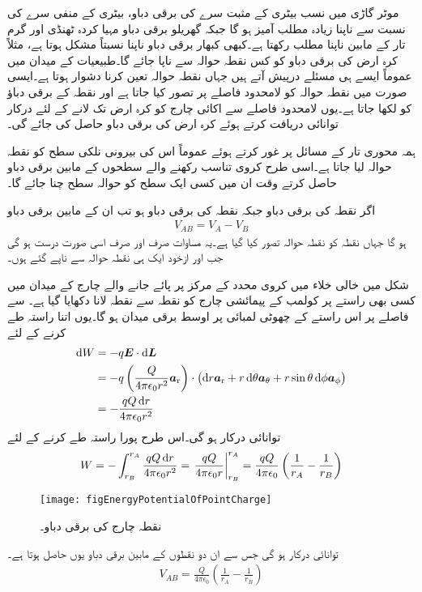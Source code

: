 موٹر گاڑی میں نسب بیٹری کے مثبت سرے کی برقی دباو،  بیٹری کے منفی سرے کی نسبت سے ناپنا زیادہ مطلب آمیز ہو گا جبکہ گھریلو برقی دباو مہیا کردہ ٹھنڈی اور گرم تار کے مابین ناپنا مطلب رکھتا ہے۔کبھی کبھار برقی دباو ناپنا نسبتاً مشکل ہوتا ہے، مثلاً  کرہ ارض  کی برقی دباو کو کس نقطہ حوالہ سے ناپا جائے گا۔طبیعیات کے میدان میں عموماً ایسے ہی مسئلے درپیش آتے ہیں جہاں نقطہ حوالہ تعین کرنا دشوار ہوتا ہے۔ایسی صورت میں نقطہ حوالہ کو لامحدود فاصلے پر تصور کیا جاتا ہے اور نقطہ  کے برقی دباؤ کو  لکھا جاتا ہے۔یوں لامحدود فاصلے سے اکائی چارج کو کرہ ارض تک لانے کے لئے درکار توانائی دریافت کرتے ہوئے کرہ ارض کی برقی دباو حاصل کی جائے گی۔

ہمہ محوری تار کے مسائل پر غور کرتے ہوئے عموماً اس کی بیرونی نلکی سطح کو نقطہ حوالہ لیا جاتا ہے۔اسی طرح کروی تناسب رکھنے والے سطحوں کے مابین برقی دباو حاصل کرتے وقت ان میں کسی ایک سطح کو حوالہ سطح چنا جائے گا۔

اگر نقطہ  کی برقی دباو  جبکہ نقطہ  کی برقی دباو  ہو تب ان کے مابین برقی دباو 
\begin{align}
V_{AB}=V_A-V_B
\end{align}
ہو گا جہاں نقطہ  کو نقطہ حوالہ تصور کیا گیا ہے۔یہ مساوات صرف اور صرف اسی صورت درست ہو گی جب  اور   ازخود  ایک ہی نقطہ حوالہ سے ناپے گئے ہوں۔

شکل   میں خالی خلاء میں کروی محدد کے مرکز پر پائے جانے والے چارج  کے میدان میں کسی بھی راستے پر   کولمب  کے پیمائشی چارج کو نقطہ  سے نقطہ  لانا دکھایا گیا ہے۔ سے  فاصلے پر اس راستے کے چھوٹی لمبائی  پر اوسط برقی میدان  ہو گا۔یوں اتنا راستہ طے کرنے کے لئے
\begin{align*}
\dif W&=- q \kvec{E} \cdot \dif \kvec{L}\\
&=-q \left(\frac{Q}{4\pi \epsilon_0 r^2}\ar \right) \cdot \left(\dif r \ar+r \dif \theta \atheta+r \sin \theta \dif \phi \aphi \right)\\
&=-\frac{q Q \dif r}{4 \pi \epsilon_0 r^2}
\end{align*}
توانائی درکار ہو گی۔اس طرح پورا راستہ طے کرنے کے لئے
\begin{align*}
W=-\int_{r_B}^{r_A} \frac{qQ \dif r}{4 \pi \epsilon_0 r^2}=\left. \frac{qQ}{4\pi \epsilon_0 r}\right|_{r_B}^{r_A}=\frac{qQ}{4\pi \epsilon_0} \left( \frac{1}{r_A}-\frac{1}{r_B} \right)
\end{align*}
%
\begin{figure}
\centering
\texttt{[image: figEnergyPotentialOfPointCharge]}
\caption{نقطہ چارج کی برقی دباو۔}
\label{شکل_توانائی_نقطہ_چارج_دباو}
\end{figure}
توانائی درکار ہو گی جس سے ان دو نقطوں کے مابین برقی دباو  یوں حاصل ہوتا ہے۔
\begin{align}\label{مساوات_توانائی_نقطہ_چارج_کی_دباو}
V_{AB}=\frac{Q}{4\pi \epsilon_0} \left( \frac{1}{r_A}-\frac{1}{r_B} \right)
\end{align}

